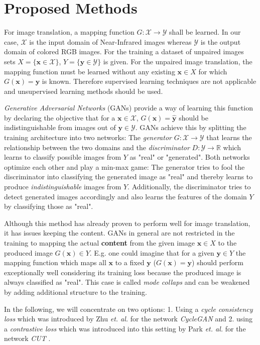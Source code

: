 \documentclass[a4paper,11pt, DIV=12]{scrartcl}
\newcommand{\x}{\boldsymbol{x}}
\newcommand{\y}{\boldsymbol{y}}
\begin{document}
\section{Proposed Methods}

For image translation, a mapping function $G: \mathcal{X} \to \mathcal{Y}$ shall be learned. 
In our case, $\mathcal{X}$ is the input domain of Near-Infrared images whereas $\mathcal{Y}$ is the output domain of colored RGB images.
For the training a dataset of unpaired images sets $X = \{\x \in \mathcal{X}\}$, $Y = \{\y \in \mathcal{Y}\}$ is given.
For the unpaired image translation, the mapping function must be learned without any existing $\x \in X$ for which $G(\x)=\y$ is known. 
Therefore supervised learning techniques are not applicable and unsupervised learning methods should be used.  

\textit{Generative Adversarial Networks} (GANs) provide a way of learning this function by declaring the objective that for a $\x \in \mathcal{X}$, $G(\x) = \hat{\y}$
should be indistinguishable from images out of $\y \in \mathcal{Y}$. GANs achieve this by splitting the training architecture into two networks: 
The \textit{generator} $G: \mathcal{X} \to \mathcal{Y}$ that learns the relationship between the two domains and the \textit{discriminator} $D: \mathcal{Y} \to \mathbb{R}$ which learns to 
classify possible images from $Y$ as "real" or "generated". 
Both networks optimize each other and play a min-max game: 
The generator tries to fool the discriminator into classifying the generated image as "real" and thereby learns to produce \textit{indistinguishable} images from $Y$.  
Additionally, the discriminator tries to detect generated images accordingly and also learns the features of the domain $Y$ by classifying those as "real". 

Although this method has already proven to perform well for image translation, %
it has issues keeping the content. GANs in general are not restricted in the training to mapping the actual \textbf{content} from the given image 
$\x \in X$ to the produced image $G(\x) \in Y$.
E.g. one could imagine that for a given $\y \in Y$ the mapping function which maps all $\x$ to a fixed $\y$ ($G(\x) = \y$) 
should perform exceptionally well considering its training loss because the produced image is always classified as "real". 
This case is called \textit{mode collaps} and can be weakened by adding additional structure to the training. 

In the following, we will concentrate on two options: 
1. Using a \textit{cycle consistency loss} which was introduced by Zhu \textit{et. al.} for the network \textit{CycleGAN} \cite{cyclegan_orig}
and 2. using a \textit{contrastive loss} which was introduced into this setting by Park \textit{et. al.} for the network \textit{CUT} \cite{cut}.
\end{document}
